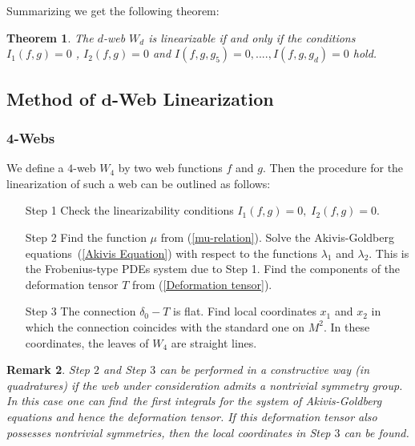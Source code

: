 \documentclass{article}
\newtheorem{theorem}{Theorem}
\newtheorem{remark}[theorem]{Remark}
\begin{document}
Summarizing we get the following theorem:

\begin{theorem}
The $d$-web $W_{d}$ is linearizable if and only if the conditions $%
I_{1}\left( f,g\right) =0$ , $I_{2}\left( f,g\right) =0$ and $I\left(
f,g,g_{5}\right) =0,....,I\left( f,g,g_{d}\right) =0$ hold.
\end{theorem}

\subsection{Method of $\boldsymbol{d}$-Web Linearization}

\subsubsection{4-Webs}

We define a $4$-web $W_{4}$ by two web functions $f$ and $g.$ Then the
procedure for the linearization of such a web can be outlined as follows:

\begin{itemize}
\item[Step 1] Check the linearizability conditions $I_{1}\left( f,g\right)
=0,\;I_{2}\left( f,g\right) =0.$

\item[Step 2] Find the function $\mu $ from (\ref{mu-relation}). Solve the
Akivis-Goldberg equations\ (\ref{Akivis Equation}) with respect to the
functions $\lambda _{1}$ and $\lambda _{2}$. This is the Frobenius-type PDEs
system due to Step 1. Find the components of the deformation tensor $T$ from
(\ref{Deformation tensor}).

\item[Step 3] The connection $\delta _{0}-T$ is flat. Find local coordinates
$x_{1}$ and $x_{2}$ in which the connection coincides with the standard one
on $M^{2}.$ In these coordinates, the leaves of $W_{4}$ are straight lines.
\end{itemize}

\begin{remark}
Step $2$ and Step $3$ can be performed in a constructive way (in
quadratures) if the web under consideration admits a nontrivial symmetry
group. In this case one can find\ the first integrals for the system of
Akivis-Goldberg equations and hence the deformation tensor. If this
deformation tensor also possesses nontrivial symmetries, then the local
coordinates in Step $3$ can be found.
\end{remark}
\end{document}

